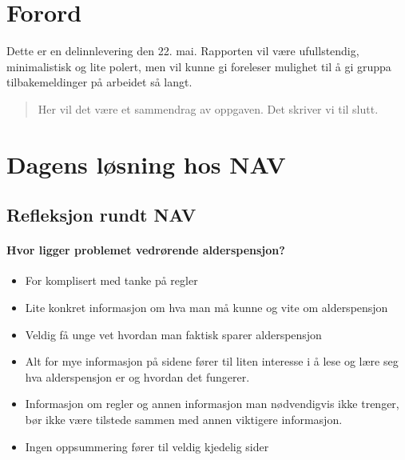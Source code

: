 \documentclass[informationsecurity]{gucmasterproject}
\begin{document}
\thesisdate{\gucmasterthesisdate}
\makefrontpages %




\chapter*{Forord}

Dette er en delinnlevering den 22. mai. Rapporten vil være ufullstendig, minimalistisk og lite polert, men vil kunne gi foreleser mulighet til å gi gruppa tilbakemeldinger på arbeidet så langt.

\newpage

\begin{abstract}
Her vil det være et sammendrag av oppgaven. Det skriver vi til slutt.

\end{abstract}


\tableofcontents






\chapter{Dagens løsning hos NAV}
\section{Refleksjon rundt NAV}
\subsubsection{Hvor ligger problemet vedrørende alderspensjon?}
\begin{itemize}
\item For komplisert med tanke på regler
\item Lite konkret informasjon om hva man må kunne og vite om alderspensjon
\item Veldig få unge vet hvordan man faktisk sparer alderspensjon 
\item Alt for mye informasjon på sidene fører til liten interesse i å lese og lære seg hva alderspensjon er og hvordan det fungerer.
\item Informasjon om regler og annen informasjon man nødvendigvis ikke trenger, bør ikke være tilstede sammen med annen viktigere informasjon.
\item Ingen oppsummering fører til veldig kjedelig sider
\end{itemize}
\end{document}
